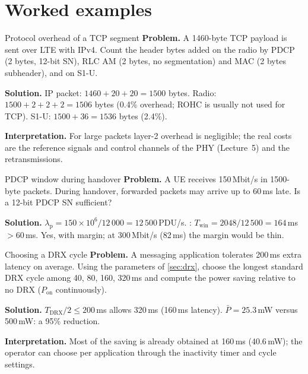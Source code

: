 \documentclass[11pt,a4paper]{article}
\begin{document}
\section{Worked examples}

\begin{examplebox}{Protocol overhead of a TCP segment}\label{ex:overhead}
\textbf{Problem.} A 1460-byte TCP payload is sent over LTE with IPv4. Count the header bytes added
on the radio by PDCP (2 bytes, 12-bit SN), RLC AM (2 bytes, no segmentation) and MAC (2 bytes
subheader), and on S1-U.

\textbf{Solution.} IP packet: $1460 + 20 + 20 = 1500$ bytes. Radio: $1500 + 2 + 2 + 2 = 1506$ bytes
(0.4\% overhead; ROHC is usually not used for TCP). S1-U: $1500 + 36 = 1536$ bytes (2.4\%).

\textbf{Interpretation.} For large packets layer-2 overhead is negligible; the real costs are the
reference signals and control channels of the PHY (Lecture~5) and the retransmissions.
\end{examplebox}

\begin{examplebox}{PDCP window during handover}\label{ex:pdcp}
\textbf{Problem.} A UE receives 150\,Mbit/s in 1500-byte packets. During handover, forwarded
packets may arrive up to 60\,ms late. Is a 12-bit PDCP SN sufficient?

\textbf{Solution.} $\lambda_\mathrm{p} = 150\times10^6/12\,000 = 12\,500$\,PDU/s. :
$T_{\mathrm{win}} = 2048/12\,500 = 164$\,ms $> 60$\,ms. Yes, with margin; at 300\,Mbit/s (82\,ms) the
margin would be thin.
\end{examplebox}

\begin{examplebox}{Choosing a DRX cycle}\label{ex:drx}
\textbf{Problem.} A messaging application tolerates 200\,ms extra latency on average. Using the
parameters of \cref{sec:drx}, choose the longest standard DRX cycle among 40, 80, 160, 320\,ms and
compute the power saving relative to no DRX ($P_{\mathrm{on}}$ continuously).

\textbf{Solution.} $T_{\mathrm{DRX}}/2 \le 200$\,ms allows 320\,ms (160\,ms latency). $\bar P = 25.3$\,mW
versus 500\,mW: a 95\% reduction.

\textbf{Interpretation.} Most of the saving is already obtained at 160\,ms (40.6\,mW); the operator
can choose per application through the inactivity timer and cycle settings.
\end{examplebox}
\end{document}
